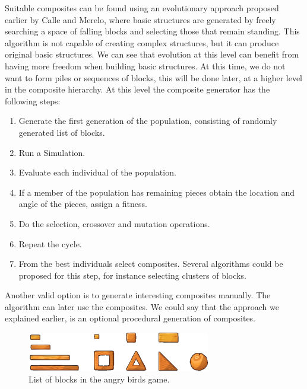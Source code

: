 \documentclass[conference]{IEEEtran}
\begin{document}
Suitable composites can be found using an evolutionary approach proposed
earlier by Calle and Merelo, where basic structures are generated by freely
searching a space of falling blocks and selecting those that remain
standing. This algorithm is not capable of creating complex structures, but
it can produce original basic structures. We can see that evolution at this
level can benefit from having more freedom when building basic structures.
At this time, we do not want to form piles or sequences of blocks, this will
be done later, at a higher level in the composite hierarchy.    
At this level the composite generator has the following steps:
\begin{enumerate}
\item Generate the first generation of the population, consisting of
randomly generated list of blocks.
\item Run a Simulation.
\item Evaluate each individual of the population.
\item If a member of the population has remaining pieces obtain the location
and angle of the pieces, assign a fitness.
\item Do the selection, crossover and mutation operations.
\item Repeat the cycle.
\item From the best individuals select composites. Several algorithms could
be proposed for this step, for instance selecting clusters of blocks.
\end{enumerate}
    
Another valid option is to generate interesting composites manually.  The
algorithm can later use the composites. We could say that the approach we
explained earlier, is an optional procedural generation of composites.

\begin{figure}[htbp]
\centerline{\includegraphics[width=80mm]{Images/list_pieces.png}}
\caption{List of blocks in the angry birds game.}
\label{piece_list}
\end{figure}
\end{document}
